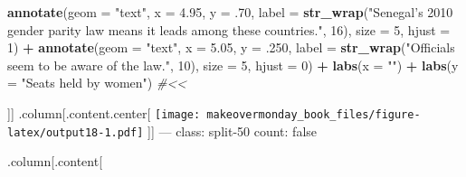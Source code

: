 \documentclass[]{book}
\newenvironment{Shaded}{\begin{snugshade}}{\end{snugshade}}
\newcommand{\KeywordTok}[1]{\textcolor[rgb]{0.13,0.29,0.53}{\textbf{#1}}}
\newcommand{\DataTypeTok}[1]{\textcolor[rgb]{0.13,0.29,0.53}{#1}}
\newcommand{\DecValTok}[1]{\textcolor[rgb]{0.00,0.00,0.81}{#1}}
\newcommand{\FloatTok}[1]{\textcolor[rgb]{0.00,0.00,0.81}{#1}}
\newcommand{\StringTok}[1]{\textcolor[rgb]{0.31,0.60,0.02}{#1}}
\newcommand{\CommentTok}[1]{\textcolor[rgb]{0.56,0.35,0.01}{\textit{#1}}}
\newcommand{\OperatorTok}[1]{\textcolor[rgb]{0.81,0.36,0.00}{\textbf{#1}}}
\newcommand{\NormalTok}[1]{#1}
\theoremstyle{definition}
\theoremstyle{definition}
\theoremstyle{definition}
\theoremstyle{remark}
\begin{document}
\begin{Shaded}
\begin{Highlighting}[]
\StringTok{  }\KeywordTok{annotate}\NormalTok{(}\DataTypeTok{geom =} \StringTok{"text"}\NormalTok{, }\DataTypeTok{x =} \FloatTok{4.95}\NormalTok{, }\DataTypeTok{y =}\NormalTok{ .}\DecValTok{70}\NormalTok{, }\DataTypeTok{label =} \KeywordTok{str_wrap}\NormalTok{(}\StringTok{"Senegal's 2010 gender parity law means it leads among these countries."}\NormalTok{, }\DecValTok{16}\NormalTok{), }\DataTypeTok{size =} \DecValTok{5}\NormalTok{, }\DataTypeTok{hjust =} \DecValTok{1}\NormalTok{) }\OperatorTok{+}
\StringTok{  }\KeywordTok{annotate}\NormalTok{(}\DataTypeTok{geom =} \StringTok{"text"}\NormalTok{, }\DataTypeTok{x =} \FloatTok{5.05}\NormalTok{, }\DataTypeTok{y =}\NormalTok{ .}\DecValTok{250}\NormalTok{, }\DataTypeTok{label =} \KeywordTok{str_wrap}\NormalTok{(}\StringTok{"Officials seem to be aware of the law."}\NormalTok{, }\DecValTok{10}\NormalTok{), }\DataTypeTok{size =} \DecValTok{5}\NormalTok{, }\DataTypeTok{hjust =} \DecValTok{0}\NormalTok{) }\OperatorTok{+}
\StringTok{  }\KeywordTok{labs}\NormalTok{(}\DataTypeTok{x =} \StringTok{""}\NormalTok{) }\OperatorTok{+}
\StringTok{  }\KeywordTok{labs}\NormalTok{(}\DataTypeTok{y =} \StringTok{"Seats held by women"}\NormalTok{)  }\CommentTok{#<<}
\end{Highlighting}
\end{Shaded}

{]}{]} .column{[}.content.center{[}
\texttt{[image: makeovermonday\_book\_files/figure-latex/output18-1.pdf]}
{]}{]} --- class: split-50 count: false

.column{[}.content{[}
\end{document}
